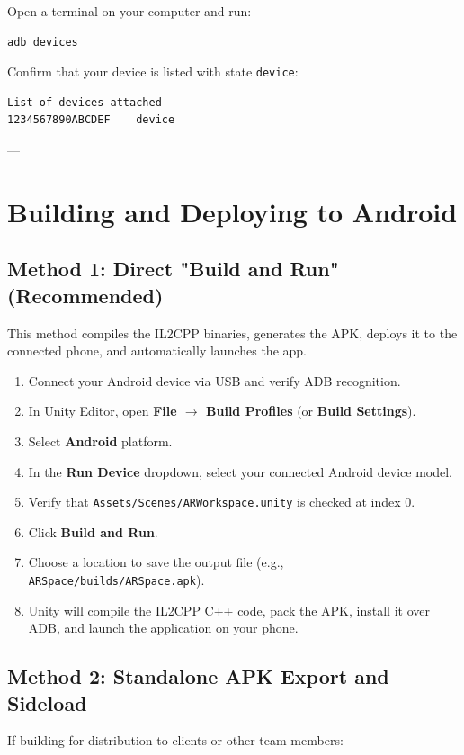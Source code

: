 \documentclass[11pt,a4paper]{article}
\begin{document}
Open a terminal on your computer and run:
\begin{lstlisting}[language=bash]
adb devices
\end{lstlisting}
Confirm that your device is listed with state \texttt{device}:
\begin{lstlisting}
List of devices attached
1234567890ABCDEF    device
\end{lstlisting}

---

\section{Building and Deploying to Android}

\subsection{Method 1: Direct "Build and Run" (Recommended)}
This method compiles the IL2CPP binaries, generates the APK, deploys it to the connected phone, and automatically launches the app.

\begin{enumerate}
    \item Connect your Android device via USB and verify ADB recognition.
    \item In Unity Editor, open \textbf{File $\rightarrow$ Build Profiles} (or \textbf{Build Settings}).
    \item Select \textbf{Android} platform.
    \item In the \textbf{Run Device} dropdown, select your connected Android device model.
    \item Verify that \texttt{Assets/Scenes/ARWorkspace.unity} is checked at index 0.
    \item Click \textbf{Build and Run}.
    \item Choose a location to save the output file (e.g., \texttt{ARSpace/builds/ARSpace.apk}).
    \item Unity will compile the IL2CPP C++ code, pack the APK, install it over ADB, and launch the application on your phone.
\end{enumerate}

\subsection{Method 2: Standalone APK Export and Sideload}
If building for distribution to clients or other team members:
\end{document}

